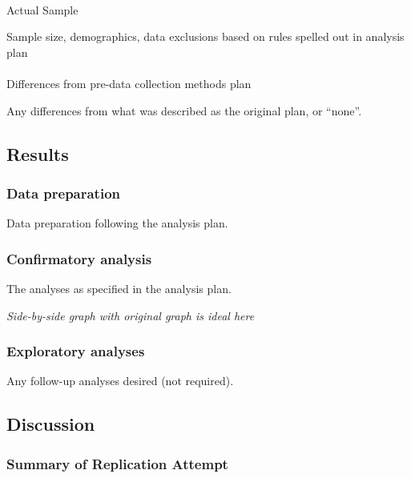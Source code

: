 \documentclass[
  letterpaper,
  DIV=11,
  numbers=noendperiod]{scrartcl}
\makeatletter
\let\oldparagraph\paragraph
\renewcommand{\paragraph}{
    \@ifstar
      \xxxParagraphStar
      \xxxParagraphNoStar
  }
\newcommand{\xxxParagraphStar}[1]{\oldparagraph*{#1}\mbox{}}
\newcommand{\xxxParagraphNoStar}[1]{\oldparagraph{#1}\mbox{}}
\newcounter{none} %
\makeatother
\begin{document}
\paragraph{Actual Sample}\label{actual-sample}

Sample size, demographics, data exclusions based on rules spelled out in
analysis plan

\paragraph{Differences from pre-data collection methods
plan}\label{differences-from-pre-data-collection-methods-plan}

Any differences from what was described as the original plan, or
``none''.

\subsection{Results}\label{results}

\subsubsection{Data preparation}\label{data-preparation}

Data preparation following the analysis plan.

\subsubsection{Confirmatory analysis}\label{confirmatory-analysis}

The analyses as specified in the analysis plan.

\emph{Side-by-side graph with original graph is ideal here}

\subsubsection{Exploratory analyses}\label{exploratory-analyses}

Any follow-up analyses desired (not required).

\subsection{Discussion}\label{discussion}

\subsubsection{Summary of Replication
Attempt}\label{summary-of-replication-attempt}
\end{document}
